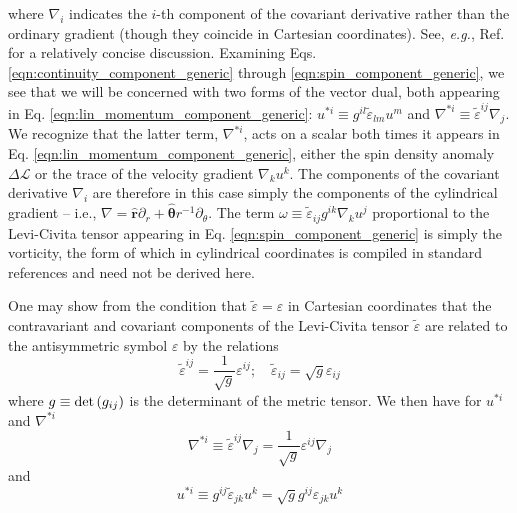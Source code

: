\documentclass[%
 reprint,
superscriptaddress,
longbibliography,
 amsmath,amssymb,
 prl,
 citeautoscript,
]{revtex4-1}
\begin{document}
where $\nabla_i$ indicates the $i$-th component of the covariant derivative rather than the ordinary gradient (though they coincide in Cartesian coordinates). See, {\it e.g.}, Ref. \cite{Landau_Vol2} for a relatively concise discussion. Examining Eqs. \ref{eqn:continuity_component_generic} through \ref{eqn:spin_component_generic}, we see that we will be concerned with two forms of the vector dual, both appearing in Eq. \ref{eqn:lin_momentum_component_generic}: $u^{*i} \equiv g^{il} \tilde{\varepsilon}_{lm} u^m$ and $\nabla^{*i} \equiv \tilde{\varepsilon}^{ij} \nabla_j$. We recognize that the latter term, $\nabla^{*i}$, acts on a scalar both times it appears in Eq. \ref{eqn:lin_momentum_component_generic}, either the spin density anomaly $\Delta \mathcal{L}$ or the trace of the velocity gradient $\nabla_k u^k$. The components of the covariant derivative $\nabla_i$ are therefore in this case simply the components of the cylindrical gradient -- i.e., $\nabla = \hat{\boldsymbol r} \partial_r + \hat{\boldsymbol \theta} r^{-1} \partial_{\theta}$. The term $\omega \equiv \tilde{\varepsilon}_{ij} g^{ik} \nabla_k u^j$ proportional to the Levi-Civita tensor appearing in Eq. \ref{eqn:spin_component_generic} is simply the vorticity, the form of which in cylindrical coordinates is compiled in standard references and need not be derived here.

One may show from the condition that $\tilde{\varepsilon} = \varepsilon$ in Cartesian coordinates that the contravariant and covariant components of the Levi-Civita tensor $\tilde{\varepsilon}$ are related to the antisymmetric symbol $\varepsilon$ by the relations \cite{Landau_Vol2}
\begin{equation}
\tilde{\varepsilon}^{ij} = \frac{1}{\sqrt{g}} \varepsilon^{ij}; \quad \tilde{\varepsilon}_{ij} = \sqrt{g} \varepsilon_{ij}
\label{eqn:LCT}
\end{equation}
where $g \equiv {\rm det} \left( g_{ij} \right)$ is the determinant of the metric tensor. We then have for $u^{*i}$ and $\nabla^{*i}$
\begin{equation}
\nabla^{*i} \equiv \tilde{\varepsilon}^{ij} \nabla_j = \frac{1}{\sqrt{g}} \varepsilon^{ij} \nabla_j
\label{eqn:dual_gradient2}
\end{equation}
and
\begin{equation}
u^{*i} \equiv g^{ij} \tilde{\varepsilon}_{jk} u^k = \sqrt{g} g^{ij} \varepsilon_{jk} u^k
\label{eqn:dual_vector2}
\end{equation}
\end{document}
